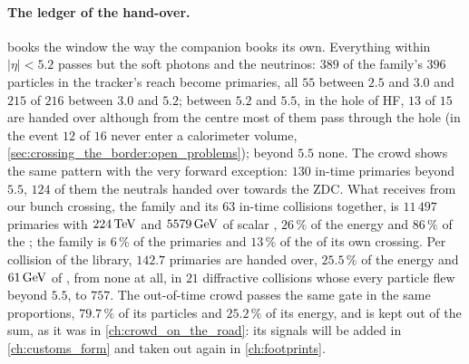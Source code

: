 \paragraph{The ledger of the hand-over.}
\label{sec:crossing_the_border:handover_ledger}
 books the window the way the
\CMSSW companion books its own. Everything within $|\eta|<5.2$ passes but
the soft photons and the neutrinos: $389$ of the family's $396$ particles in
the tracker's reach become primaries, all $55$ between $2.5$ and $3.0$ and
$215$ of $216$ between $3.0$ and $5.2$; between $5.2$ and $5.5$, in the hole of
HF, $13$ of $15$ are handed over although from the centre most of them pass
through the hole (in the \CMSSW event $12$ of $16$ never enter a
calorimeter volume, \cref{sec:crossing_the_border:open_problems}); beyond
$5.5$ none.
The crowd shows the same pattern with the very forward exception: $130$
in-time primaries beyond $5.5$, $124$ of them the neutrals handed over
towards the ZDC. What
\GEANT receives from our bunch crossing, the family and its $63$ in-time
collisions together, is $11\,497$ primaries with $224\,\mathrm{TeV}$ and $5579\,\mathrm{GeV}$ of
scalar \pt, $26\,\%$ of the energy and $86\,\%$ of the \pt; the family is
$6\,\%$ of the primaries and $13\,\%$ of the \pt of its own crossing. Per
collision of the library, $142.7$ primaries are handed over, $25.5\,\%$ of the
energy and $61\,\mathrm{GeV}$ of \pt, from none at all, in $21$ diffractive collisions
whose every particle flew beyond $5.5$, to $757$. The out-of-time crowd passes
the same gate in the same proportions, $79.7\,\%$ of its particles and
$25.2\,\%$ of its energy, and is kept out of the sum, as it was in
\cref{ch:crowd_on_the_road}: its signals will be added in
\cref{ch:customs_form} and taken out again in \cref{ch:footprints}.


